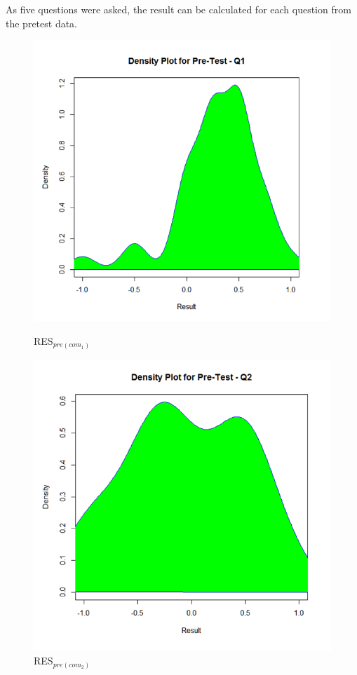 As five questions were asked, the result can be calculated for each question from the pretest data. 

\begin{figure}[h]
	\centering
	\begin{minipage}{.5\textwidth}
		\centering
		\includegraphics[width=1\linewidth]{figures/Pretest_q1}
		\caption{RES$_{pre(com_1)}$}
		\label{fig:Pretest_q1}
	\end{minipage}%
	\begin{minipage}{.5\textwidth}
		\centering
		\includegraphics[width=1\linewidth]{figures/Pretest_q2}
		\caption{RES$_{pre(com_2)}$}
		\label{fig:Pretest_q2}
	\end{minipage}
\end{figure}

